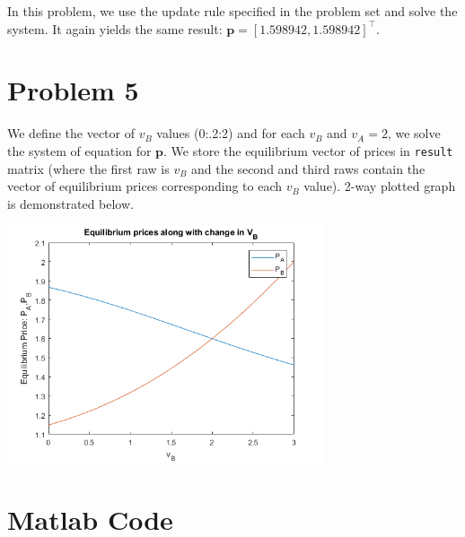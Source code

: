 \documentclass[11pt,letter]{article}
\newcommand{\vect}[1]{\boldsymbol{\mathbf{#1}}}
\newcounter{lem}[section] \setcounter{lem}{0}
\newcommand{\code}[1]{\texttt{#1}}
\begin{document}
In this problem, we use the update rule specified in the problem set and solve the system. It again yields the same result: $\vect{p}=[1.598942,1.598942]^\top$. 


\section*{Problem 5}

We define the vector of $v_B$ values (0:.2:2) and for each $v_B$ and $v_A=2$, we solve the  system of equation for $\vect{p}$. We store the equilibrium vector of prices in \code{result} matrix (where the first raw is $v_B$ and the second and third raws contain the vector of equilibrium prices corresponding to each $v_B$ value). 2-way plotted graph is demonstrated below.

\begin{center}
\includegraphics[width=0.7\textwidth]{Problem5.png} 
\end{center}




\section*{Matlab Code}

\end{document}
